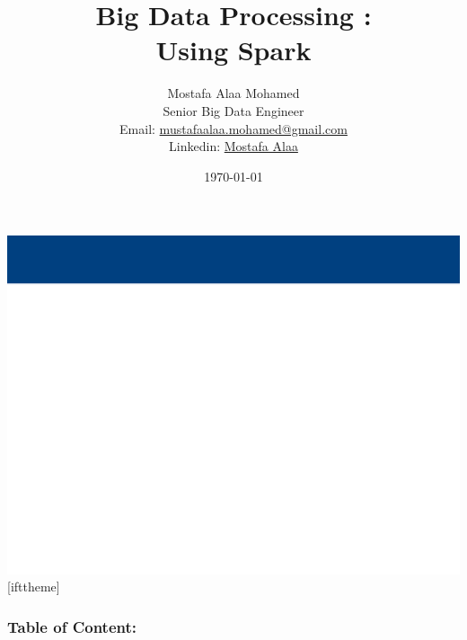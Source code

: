 \documentclass[handout]{beamer}
\title{Big Data Processing :\\ Using Spark}
\author{Mostafa Alaa Mohamed\\ Senior Big Data Engineer \\ Email: \href{mailto: mustafaalaa.mohamed@gmail.com}{mustafaalaa.mohamed@gmail.com} \\ Linkedin: \href{https://www.linkedin.com/in/mostafa-alaa-5120615b/}{Mostafa Alaa} }
\institute{
	Big Data \& Analytics Department, Etisalat UAE
}
\date{\gray \today}
\begin{document}
\begin{frame}
  \titlepage
  \vspace{5cm}
\end{frame}
%
%
 {\includegraphics[width=\paperwidth,height=\paperheight]{nabil_slide_helwan_bg}}
[ifttheme]


%
%

%
\begin{frame}
	\frametitle{Table of Content:}
	\tableofcontents
\end{frame}


%

%

%

%
%
%

%
%
\end{document}
